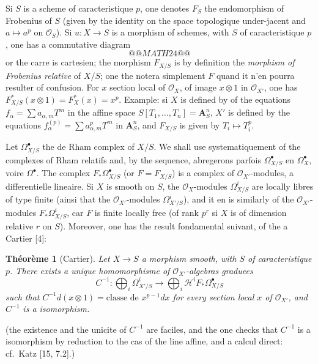 \documentclass[12pt,a4paper]{article}
\theoremstyle{plain}
\newtheorem{theorem}{Th\'eor\`eme}[section]
\theoremstyle{definition}
\theoremstyle{remark}
\newcommand{\cO}{\mathcal{O}}
\begin{document}
Si $S$ is a scheme of caracteristique $p$, one denotes $F_S$ the endomorphism of
Frobenius of $S$ (given by the identity on the space topologique under-jacent and $a \mapsto a^p$
on $\cO_S$). Si $u: X \to S$ is a morphism of schemes, with $S$ of caracteristique $p$, one has
a commutative diagram
\[
@@MATH24@@
\]
or the carre is cartesien; the morphism $F_{X/S}$ is by definition the \emph{morphism of
Frobenius relative} of $X/S$; one the notera simplement $F$ quand it n'en pourra resulter
of confusion. For $x$ section local of $\cO_X$, of image $x \otimes 1$ in $\cO_{X'}$, one has $F_{X/S}^*(x \otimes 1)
= F_X^*(x) = x^p$. Example: si $X$ is defined by of the equations $f_{\alpha} = \sum a_{\alpha,m} T^m$ in the affine space $S[T_1, \ldots, T_n] = \mathbf{A}^n_S$, $X'$ is defined by the equations $f_{\alpha}^{(p)} = \sum a_{\alpha,m}^p T^m$ in $\mathbf{A}^n_S$, and
$F_{X/S}$ is given by $T_i \mapsto T_i^p$.

Let $\Omega^{\bullet}_{X/S}$ the de Rham complex of $X/S$. We shall use systematiquement
of the complexes of Rham relatifs and, by the sequence, abregerons parfois $\Omega^{\bullet}_{X/S}$ en $\Omega^{\bullet}_X$,
voire $\Omega^{\bullet}$. The complex $F_* \Omega^{\bullet}_{X/S}$ (or $F = F_{X/S}$) is a complex of $\cO_{X'}$-modules, a
differentielle lineaire. Si $X$ is smooth on $S$, the $\cO_X$-modules $\Omega^i_{X/S}$ are locally libres
of type finite (ainsi that the $\cO_{X'}$-modules $\Omega^i_{X'/S}$), and it en is similarly of the $\cO_{X'}$-modules
$F_* \Omega^i_{X/S}$, car $F$ is finite locally free (of rank $p^r$ si $X$ is of dimension relative $r$ on
$S$). Moreover, one has the result fondamental suivant, of the a Cartier [4]:

\begin{theorem}[Cartier]\label{thm:cartier}
Let $X \to S$ a morphism smooth, with $S$ of caracteristique $p$. There exists a unique homomorphisme of $\cO_{X'}$-algebras graduees
\[
C^{-1}: \bigoplus_i \Omega^i_{X'/S} \to \bigoplus_i \mathscr{H}^i F_* \Omega^{\bullet}_{X/S}
\]
such that $C^{-1} d(x \otimes 1) = \text{classe de } x^{p-1} dx$ for every section local $x$ of $\cO_{X'}$, and $C^{-1}$ is
a isomorphism.
\end{theorem}

(the existence and the unicite of $C^{-1}$ are faciles, and the one checks that $C^{-1}$ is a
isomorphism by reduction to the cas of the line affine, and a calcul direct: cf.~Katz
[15, 7.2].)

\subsection{}
\end{document}

